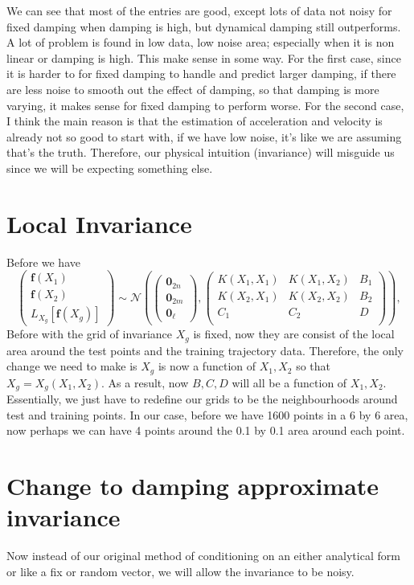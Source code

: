 \documentclass{article}
\begin{document}
We can see that most of the entries are good, except lots of data not noisy for fixed damping when damping is high, but dynamical damping still outperforms.
A lot of problem is found in low data, low noise area; especially when it is non linear or damping is high. 
This make sense in some way.
For the first case, since it is harder to for fixed damping to handle and predict larger damping, if there are less noise to smooth out the effect of damping, so that damping is more varying, it makes sense for fixed damping to perform worse. 
For the second case, I think the main reason is that the estimation of acceleration and velocity is already not so good to start with, if we have low noise, it's like we are assuming that's the truth.
Therefore, our physical intuition (invariance) will misguide us since we will be expecting something else. 
\section*{Local Invariance}
Before we have
$$
\begin{pmatrix}
  \mathbf{f}(X_1)\\\mathbf{f}(X_2) \\ L_{X_g}[\mathbf{f}(X_g)]
\end{pmatrix}
\sim \mathcal{N}
\left(
\begin{pmatrix}
  \mathbf{0}_{2n} \\ \mathbf{0}_{2m} \\ \mathbf{0}_{\ell}
\end{pmatrix},
\begin{pmatrix}
K(X_1, X_1) & K(X_1, X_2) & B_1 \\
K(X_2, X_1) & K(X_2, X_2) & B_2 \\
C_1         & C_2         & D \\
\end{pmatrix}
\right), 
$$
Before with the grid of invariance $X_g$ is fixed, now they are consist of the local area around the test points and the training trajectory data. 
Therefore, the only change we need to make is $X_g$ is now a function of $X_1, X_2$ so that $X_g = X_g(X_1, X_2)$.
As a result, now $B, C, D$ will all be a function of $X_1, X_2.$
Essentially, we just have to redefine our grids to be the neighbourhoods around test and training points.  
In our case, before we have 1600 points in a 6 by 6 area, now perhaps we can have 4 points around the 0.1 by 0.1 area around each point. 

\section*{Change to damping approximate invariance}
Now instead of our original method of conditioning on an either analytical form or like a fix or random vector, we will allow the invariance to be noisy.
\end{document}
